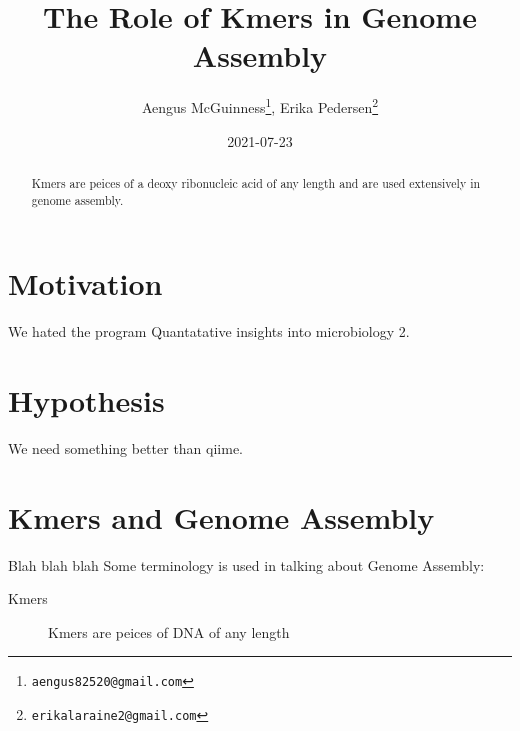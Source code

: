 \documentclass[11pt]{article}
\date{2021-07-23}
\title{The Role of Kmers in Genome Assembly}
\author{Aengus McGuinness\footnote{\texttt{aengus82520@gmail.com}},
  Erika Pedersen\footnote{\texttt{erikalaraine2@gmail.com}}}
\begin{document}
\maketitle

\label{sec:org26f53e0}
\begin{abstract}
Kmers are peices of a deoxy ribonucleic acid of any length and are used extensively in genome assembly.
\end{abstract}


\section{Motivation}
We hated the program Quantatative insights into microbiology 2.
\section{Hypothesis}

We need something better than qiime.

\section{Kmers and Genome Assembly}
Blah blah blah
Some terminology is used in talking about Genome Assembly:

\begin{description}
\item[Kmers] Kmers are peices of DNA of any length
\end{description}







\end{document}
